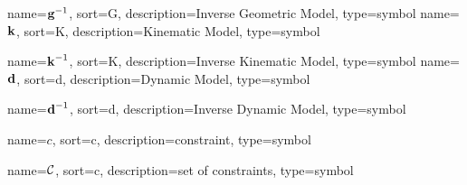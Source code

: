 	{%
		name={\ensuremath{{\vecfunc{g}^{-1}}}},
		sort=G,
		description=Inverse Geometric Model,
		type=symbol
	}
	\newcommand{\invgeometricmodel}{\gls{sym:invgeometricmodel}}
	{%
		name={\ensuremath{\vecfunc{k}}},
		sort=K,
		description=Kinematic Model,
		type=symbol
	}
	\newcommand{\kinematicmodel}{\gls{sym:kinematicmodel}}

	{%
		name={\ensuremath{{\vecfunc{k}^{-1}}}},
		sort=K,
		description=Inverse Kinematic Model,
		type=symbol
	}
	\newcommand{\invkinematicmodel}{\gls{sym:invkinematicmodel}}
	{%
		name={\ensuremath{\vecfunc{d}}},
		sort=d,
		description=Dynamic Model,
		type=symbol
	}
	\newcommand{\dynamicmodel}{\gls{sym:dynamicmodel}}

	{%
		name={\ensuremath{{\vecfunc{d}^{-1}}}},
		sort=d,
		description=Inverse Dynamic Model,
		type=symbol
	}
	\newcommand{\invdynamicmodel}{\gls{sym:invdynamicmodel}}

	{%
		name=\ensuremath{c},
		sort=c,
		description=constraint,
		type=symbol
	}
	\newcommand{\constraint}{\gls{sym:constraint}}

	{%
		name=\ensuremath{\set{C}},
		sort=c,
		description=set of constraints,
		type=symbol
	}
	\newcommand{\setofconstraints}{\gls{sym:setofconstraints}}

